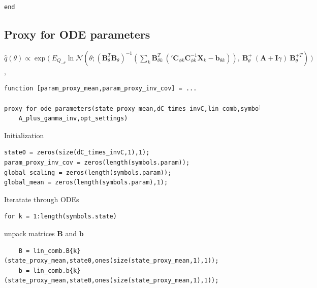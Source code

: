 \color{black}
\color{RoyalPurple}\begin{verbatim}
end
\end{verbatim}
\color{black}
\begin{par}
\section{ Proxy for ODE parameters }
\end{par} \vspace{1em}
\begin{par}
$\hat{q}(\theta) {\propto} \exp \bigg( ~E_{Q_{-\theta}}  \ln \mathcal{N}\left(\theta ; \left( \mathbf{B}_{\theta}^T \mathbf{B}_{\theta} \right)^{-1} \left( \sum_k \mathbf{B}_{\theta k}^T ~ \left( {'\mathbf{C}_{\phi k}} \mathbf{C}_{\phi k}^{-1} \mathbf{X}_k - \mathbf{b}_{\theta k} \right) \right), ~ \mathbf{B}_{\theta}^+ ~ (\mathbf{A} + \mathbf{I}\gamma) ~ \mathbf{B}_{\theta}^{+T} \right) ~\bigg)$,
\end{par} \vspace{1em}
\color{RoyalPurple}\begin{verbatim}
function [param_proxy_mean,param_proxy_inv_cov] = ...
    proxy_for_ode_parameters(state_proxy_mean,dC_times_invC,lin_comb,symbols,...
    A_plus_gamma_inv,opt_settings)
\end{verbatim}
\color{black}
\begin{par}
Initialization
\end{par} \vspace{1em}
\color{RoyalPurple}\begin{verbatim}
state0 = zeros(size(dC_times_invC,1),1);
param_proxy_inv_cov = zeros(length(symbols.param));
global_scaling = zeros(length(symbols.param));
global_mean = zeros(length(symbols.param),1);
\end{verbatim}
\color{black}
\begin{par}
Iteratate through ODEs
\end{par} \vspace{1em}
\color{RoyalPurple}\begin{verbatim}
for k = 1:length(symbols.state)
\end{verbatim}
\color{black}
\begin{par}
unpack matrices $\mathbf{B}$ and $\mathbf{b}$
\end{par} \vspace{1em}
\color{RoyalPurple}\begin{verbatim}
    B = lin_comb.B{k}(state_proxy_mean,state0,ones(size(state_proxy_mean,1),1));
    b = lin_comb.b{k}(state_proxy_mean,state0,ones(size(state_proxy_mean,1),1));
\end{verbatim}
